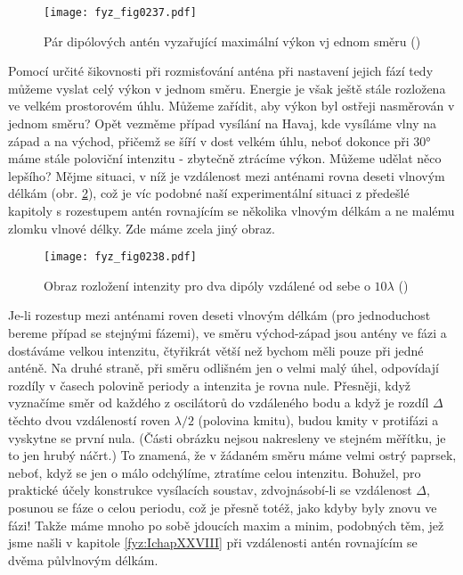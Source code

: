     \begin{figure}[ht!] %
      \centering
      \texttt{[image: fyz\_fig0237.pdf]}
      \caption{Pár dipólových antén vyzařující maximální výkon vj ednom směru
               (\cite[s.~384]{Feynman01})}
      \label{fyz:fig0237}
    \end{figure}
    
    Pomocí určité šikovnosti při rozmisťování anténa při nastavení jejich fází tedy můžeme vyslat 
    celý výkon v jednom směru. Energie je však ještě stále rozložena ve velkém prostorovém úhlu. 
    Můžeme zařídit, aby výkon byl ostřeji nasměrován v jednom směru? Opět vezměme případ vysílání 
    na Havaj, kde vysíláme vlny na západ a na východ, přičemž se šíří v dost velkém úhlu, neboť 
    dokonce při \ang{30} máme stále poloviční intenzitu - zbytečně ztrácíme výkon. Můžeme udělat 
    něco lepšího? Mějme situaci, v níž je vzdálenost mezi anténami rovna deseti vlnovým délkám 
    (obr. \ref{fyz:fig0238}), což je víc podobné naší experimentální situaci z předešlé kapitoly s 
    rozestupem antén rovnajícím se několika vlnovým délkám a ne malému zlomku vlnové délky. Zde 
    máme zcela jiný obraz.
    
    \begin{figure}[ht!] %
      \centering
      \texttt{[image: fyz\_fig0238.pdf]}
      \caption{ Obraz rozložení intenzity pro dva dipóly vzdálené od sebe o \(10\lambda\)
               (\cite[s.~385]{Feynman01})}
      \label{fyz:fig0238}
    \end{figure}
    
    Je-li rozestup mezi anténami roven deseti vlnovým délkám (pro jednoduchost bereme případ se 
    stejnými fázemi), ve směru východ-západ jsou antény ve fázi a dostáváme velkou intenzitu, 
    čtyřikrát větší než bychom měli pouze při jedné anténě. Na druhé straně, při směru odlišném jen 
    o velmi malý úhel, odpovídají rozdíly v časech polovině periody a intenzita je rovna nule. 
    Přesněji, když vyznačíme směr od každého z oscilátorů do vzdáleného bodu a když je rozdíl 
    \(\Delta\) těchto dvou vzdáleností roven \(\lambda/2\) (polovina kmitu), budou kmity v 
    protifázi a vyskytne se první nula. (Části obrázku nejsou nakresleny ve stejném měřítku, je to 
    jen hrubý náčrt.) To znamená, že v žádaném směru máme velmi ostrý paprsek, neboť, když se jen o 
    málo odchýlíme, ztratíme celou intenzitu. Bohužel, pro praktické účely konstrukce vysílacích 
    soustav, zdvojnásobí-li se vzdálenost \(\Delta\), posunou se fáze o celou periodu, což je 
    přesně totéž, jako kdyby byly znovu ve fázi! Takže máme mnoho po sobě jdoucích maxim a minim, 
    podobných těm, jež jsme našli v kapitole \ref{fyz:IchapXXVIII} při vzdálenosti antén rovnajícím 
    se dvěma půlvlnovým délkám.
    
